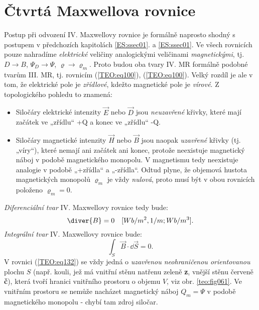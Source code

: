   \section{Čtvrtá Maxwellova rovnice}\label{ES:sec09}
    Postup při odvození IV. Maxwellovy rovnice je formálně naprosto shodný s postupem v předchozích
    kapitolách \ref{ES:ssec01}. a \ref{ES:ssec01}. Ve všech rovnicích pouze nahradíme
    \emph{elektrické} veličiny analogickými veličinami \emph{magnetickými}, tj. \(D\rightarrow B\),
    \(\Psi_D\rightarrow \Psi\), \(\varrho\rightarrow \varrho_m\). Proto budou oba tvary IV. MR
    formálně podobné tvarům III. MR, tj. rovnicím (\ref{TEO:eq100}), (\ref{TEO:eq100}). Velký rozdíl
    je ale v tom, že elektrické pole je \emph{zřídlové}, kdežto magnetické pole je \emph{vírové}. Z
    topologického pohledu to znamená:
    \begin{itemize}[noitemsep]
      \item Siločáry elektrické intenzity \(\vec{E}\) nebo \(\vec{D}\) jsou \emph{neuzavřené} 
            křivky, které mají začátek ve „zřídlu“ +Q a konec ve „zřídlu“ -Q.
    
      \item Siločáry magnetické intenzity \(\vec{H}\) nebo \(\vec{B}\) jsou naopak \emph{uzavřené}
            křivky (tj. „víry“), které  nemají ani začátek ani konec, protože neexistuje magnetický
            náboj v podobě magnetického monopolu. V magnetismu tedy neexistuje analogie v podobě
            „+zřídla“ a „-zřídla“. Odtud plyne, že objemová hustota magnetických monopolů
            \(\varrho_m\) je vždy \emph{nulová}, proto musí být v obou rovnicích položeno
            \(\varrho_m = 0\).
    \end{itemize}
    \emph{Diferenciální tvar} IV. Maxwellovy rovnice tedy bude:
    \begin{equation*}
      \diver{B} = 0 \quad [Wb/m^2,1/m; Wb/m^3].
    \end{equation*}
    \emph{Integrální tvar} IV. Maxwellovy rovnice bude:
    \begin{equation}\label{TEO:eq132}
      \int_S\vec{B}\cdot \dd{\vec{S}} = 0.
    \end{equation}    
    V rovnici (\ref{TEO:eq132}) se vždy jedná o \emph{uzavřenou neohraničenou orientovanou} plochu
    \(S\) (např. kouli, jež má vnitřní stěnu natřenu zeleně \textbf{z}, vnější stěnu červeně
    \textbf{č}), která tvoří hranici vnitřního prostoru o objemu \(V\), viz obr. \ref{teo:fig061}.
    Ve vnitřním prostoru se nemůže nacházet magnetický náboj \(Q_m = \Psi\) v podobě magnetického
    monopolu - chybí tam zdroj siločar.
   
